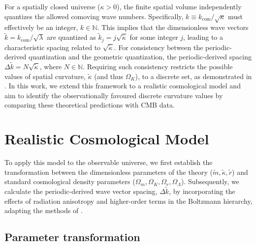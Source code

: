 For a spatially closed universe ($\kappa > 0$), the finite spatial volume independently quantizes the allowed comoving wave numbers. Specifically, $k \equiv k_{\mathrm{com}}/\sqrt{\kappa}$ must effectively be an integer, $k \in \mathbb{N}$. %
This implies that the dimensionless wave vectors $\tilde k = k_{\mathrm{com}}/\sqrt{\lambda}$ are quantized as $\tilde k_j = j \sqrt{\tilde{\kappa}}$ for some integer $j$, leading to a characteristic spacing related to $\sqrt{\tilde{\kappa}}$. %
For consistency between the periodic-derived quantization and the geometric quantization, the periodic-derived spacing $\Delta \tilde k = N \sqrt{\tilde{\kappa}}$, where $N \in \mathbb{N}$. %
Requiring such consistency restricts the possible values of spatial curvature, $\tilde{\kappa}$ (and thus $\Omega_K$), to a discrete set, as demonstrated in \cite{PhysRevD.110.103528}.
In this work, we extend this framework to a realistic cosmological model and aim to identify the observationally favoured discrete curvature values by comparing these theoretical predictions with CMB data. %

\section{Realistic Cosmological Model}\label{sec:real_cosmology} %

To apply this model to the observable universe, we first establish the transformation between the dimensionless parameters of the theory ($\tilde m, \tilde \kappa, \tilde r$) and standard cosmological density parameters ($\Omega_m, \Omega_K, \Omega_r, \Omega_\Lambda$). %
Subsequently, we calculate the periodic-derived wave vector spacing, $\Delta \tilde k$, by incorporating the effects of radiation anisotropy and higher-order terms in the Boltzmann hierarchy, adapting the methods of \cite{2022PhRvD.105h3515B, 2022PhRvD.105l3508P}. %

\subsection{Parameter transformation}\label{subsec:param_transform}

